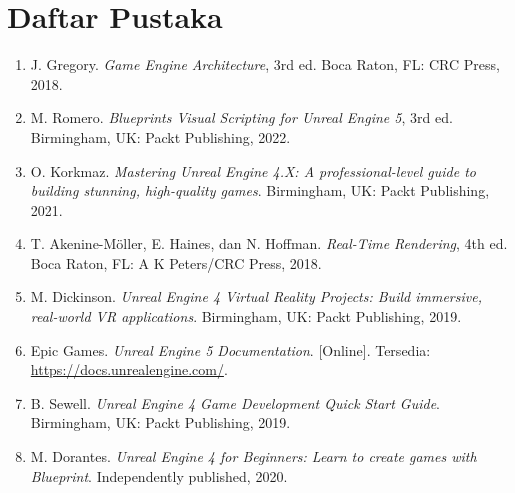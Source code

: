 \chapter{Daftar Pustaka}
\begin{enumerate}
    \item \label{gregory} J. Gregory. \textit{Game Engine Architecture}, 3rd ed. Boca Raton, FL: CRC Press, 2018.
    
    \item \label{romero} M. Romero. \textit{Blueprints Visual Scripting for Unreal Engine 5}, 3rd ed. Birmingham, UK: Packt Publishing, 2022.
    
    \item \label{korkmaz} O. Korkmaz. \textit{Mastering Unreal Engine 4.X: A professional-level guide to building stunning, high-quality games}. Birmingham, UK: Packt Publishing, 2021.
    
    \item \label{akenine} T. Akenine-Möller, E. Haines, dan N. Hoffman. \textit{Real-Time Rendering}, 4th ed. Boca Raton, FL: A K Peters/CRC Press, 2018.
    
    \item \label{dickinson} M. Dickinson. \textit{Unreal Engine 4 Virtual Reality Projects: Build immersive, real-world VR applications}. Birmingham, UK: Packt Publishing, 2019.
    
    \item \label{epic} Epic Games. \textit{Unreal Engine 5 Documentation}. [Online]. Tersedia: \url{https://docs.unrealengine.com/}.
    
    \item \label{sewell} B. Sewell. \textit{Unreal Engine 4 Game Development Quick Start Guide}. Birmingham, UK: Packt Publishing, 2019.
    
    \item \label{dorantes} M. Dorantes. \textit{Unreal Engine 4 for Beginners: Learn to create games with Blueprint}. Independently published, 2020.
\end{enumerate}